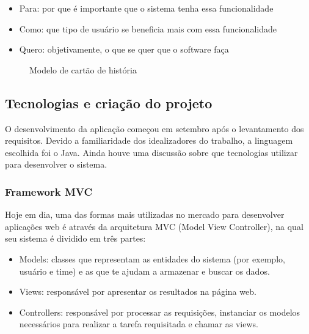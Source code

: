 \begin{itemize}
	\item Para: por que é importante que o sistema tenha essa funcionalidade
	\item Como: que tipo de usuário se beneficia mais com essa funcionalidade
	\item Quero: objetivamente, o que se quer que o software faça
\end{itemize}

\begin{figure}[H]
  \hspace*{-4em}
  \caption{Modelo de cartão de história}\label{figura:cartao}
\end{figure}

\subsection{Tecnologias e criação do projeto}

O desenvolvimento da aplicação começou em setembro após o levantamento dos requisitos. Devido a familiaridade dos idealizadores do trabalho, a linguagem escolhida foi o Java. Ainda houve uma discussão sobre que tecnologias utilizar para desenvolver o sistema.

\subsubsection*{Framework MVC}

Hoje em dia, uma das formas mais utilizadas no mercado para desenvolver aplicações web é através da arquitetura MVC (Model View Controller), na qual seu sistema é dividido em três partes:

\begin{itemize}
	\item Models: classes que representam as entidades do sistema (por exemplo, usuário e time) e as que te ajudam a armazenar e buscar os dados.
	\item Views: responsável por apresentar os resultados na página web.
	\item Controllers: responsável por processar as requisições, instanciar os modelos necessários para realizar a tarefa requisitada e chamar as views.
\end{itemize}

